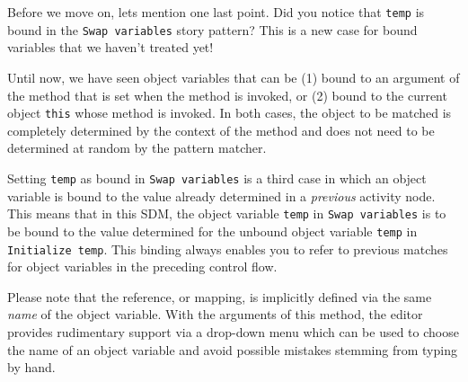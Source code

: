 Before we move on, lets mention one last point.  Did you notice that \texttt{temp} is bound in the \texttt{Swap variables} story pattern?  This is a new case
for bound variables that we haven't treated yet!

Until now, we have seen object variables that can be (1) bound to an argument of the method that is set when the method is invoked, or (2) bound to the current
object \texttt{this} whose method is invoked. In both cases, the object to be matched is completely determined by the context of the method and does not need to
be determined at random by the pattern matcher.

Setting \texttt{temp} as bound in \texttt{Swap variables} is a third case in which an object variable is bound to the value already determined in a
\emph{previous} activity node. This means that in this SDM, the object variable \texttt{temp} in \texttt{Swap variables} is to be bound to the value determined
for the unbound object variable \texttt{temp} in \texttt{Initialize temp}. This binding always enables you to refer to previous matches for object variables in the
preceding control flow. 

Please note that the reference, or mapping, is implicitly defined via the same \emph{name} of the object variable. With the arguments of this method, the editor
provides rudimentary support via a drop-down menu which can be used to choose the name of an object variable and avoid possible mistakes stemming from typing by
hand.






